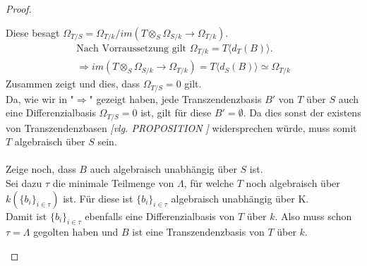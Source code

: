 \documentclass[10pt,a4paper]{report}
\newcommand{\comment}[1]{}
\newcommand{\divR}[2]{\Omega_{#1/#2}}
\newcommand{\divf}[1]{d_{#1}}
\newcommand{\Tensor}[3]{#1 \otimes_{#2} #3}
\newcommand{\immage}[1]{im(#1)}
\begin{document}
\begin{proof}
\begin{itemize}
\begin{center}
\end{center}
Diese besagt $\divR{T}{S} = \divR{T}{k} / \immage{\Tensor{T}{S}{\divR{S}{k}} \longrightarrow \divR{T}{k}}$.
\begin{gather*}
\text{Nach Vorraussetzung gilt } \divR{T}{k} = T \langle \divf{T}(B) \rangle. \\
\Rightarrow \immage{\Tensor{T}{S}{\divR{S}{k}} \longrightarrow \divR{T}{k}} = T\langle \divf{S}(B) \rangle \simeq \divR{T}{k}
\end{gather*}
Zusammen zeigt und dies, dass $\divR{T}{S} = 0$ gilt.\\
Da, wie wir in "$\Rightarrow$" gezeigt haben, jede Transzendenzbasis $B'$ von $T$ über $S$ auch eine Differenzialbasis $\divR{T}{S} = 0$ ist, gilt für diese $B' = \emptyset$. Da dies sonst der existens von Transzendenzbasen \textit{[vlg. PROPOSITION ] \comment{\label{*Transzendenzbasis existiert immer}}} widersprechen würde, muss somit $T$ algebraisch über $S$ sein.\\
\ \\
Zeige noch, dass $B$ auch algebraisch unabhängig über $S$ ist.\\
Sei dazu $\tau$ die minimale Teilmenge von $\Lambda$, für welche $T$ noch algebraisch über $k(\lbrace b_i \rbrace_{i \in \tau})$ ist. Für diese ist $\lbrace b_i \rbrace_{i \in \tau}$ algebraisch unabhängig über K.\\
Damit ist $\lbrace b_i \rbrace_{i \in \tau}$ ebenfalls eine Differenzialbasis von $T$ über $k$. Also muss schon $\tau = \Lambda$ gegolten haben und $B$ ist eine Transzendenzbasis von $T$ über $k$.
\end{itemize}
\end{proof}
\end{document}
